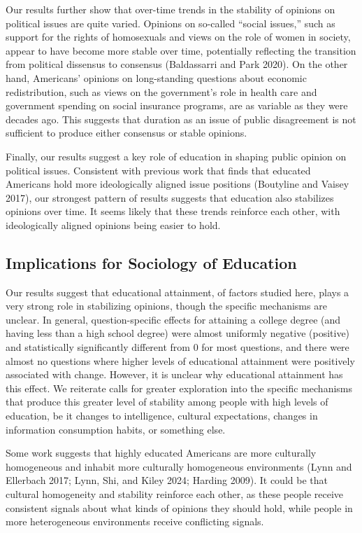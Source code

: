 \documentclass[
  12pt,
]{article}
\begin{document}
Our results further show that over-time trends in the stability of opinions on political issues are quite varied. Opinions on so-called ``social issues,'' such as support for the rights of homosexuals and views on the role of women in society, appear to have become more stable over time, potentially reflecting the transition from political dissensus to consensus (Baldassarri and Park 2020). On the other hand, Americans' opinions on long-standing questions about economic redistribution, such as views on the government's role in health care and government spending on social insurance programs, are as variable as they were decades ago. This suggests that duration as an issue of public disagreement is not sufficient to produce either consensus or stable opinions.

Finally, our results suggest a key role of education in shaping public opinion on political issues. Consistent with previous work that finds that educated Americans hold more ideologically aligned issue positions (Boutyline and Vaisey 2017), our strongest pattern of results suggests that education also stabilizes opinions over time. It seems likely that these trends reinforce each other, with ideologically aligned opinions being easier to hold.

\hypertarget{implications-for-sociology-of-education}{%
\subsection{Implications for Sociology of Education}\label{implications-for-sociology-of-education}}

Our results suggest that educational attainment, of factors studied here, plays a very strong role in stabilizing opinions, though the specific mechanisms are unclear. In general, question-specific effects for attaining a college degree (and having less than a high school degree) were almost uniformly negative (positive) and statistically significantly different from 0 for most questions, and there were almost no questions where higher levels of educational attainment were positively associated with change. However, it is unclear why educational attainment has this effect. We reiterate calls for greater exploration into the specific mechanisms that produce this greater level of stability among people with high levels of education, be it changes to intelligence, cultural expectations, changes in information consumption habits, or something else.

Some work suggests that highly educated Americans are more culturally homogeneous and inhabit more culturally homogeneous environments (Lynn and Ellerbach 2017; Lynn, Shi, and Kiley 2024; Harding 2009). It could be that cultural homogeneity and stability reinforce each other, as these people receive consistent signals about what kinds of opinions they should hold, while people in more heterogeneous environments receive conflicting signals.
\end{document}
